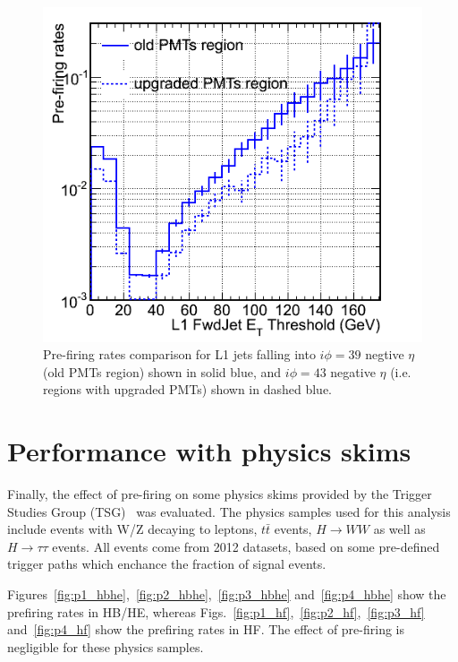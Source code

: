 \documentclass[11pt]{cmspaperpdf}
\begin{document}
\begin{figure}
\centering
\includegraphics[scale=0.45]{plots/rates_comparison_old-vs-new-PMTs.png}
\caption{Pre-firing rates comparison for L1 jets falling into $i \phi=39$ negtive $\eta$ (old PMTs region) shown in solid blue, and $i \phi=43$ negative $\eta$ (i.e. regions with upgraded PMTs) shown in dashed blue. }
\label{fig:imp} 
\end{figure}

\section{Performance with physics skims}

Finally, the effect of pre-firing on some physics skims provided by the Trigger Studies Group (TSG)~\cite{tsg} was evaluated. The physics samples used for this analysis include events with W/Z decaying to leptons, $t \bar{t}$ events, $H \rightarrow WW$ as well as $H \rightarrow \tau\tau$ events. All events come from 2012 datasets, based on some pre-defined trigger paths which enchance the fraction of signal events.

Figures~\ref{fig:p1_hbhe},~\ref{fig:p2_hbhe},~\ref{fig:p3_hbhe} and~\ref{fig:p4_hbhe} show the prefiring rates in HB/HE, whereas Figs.~\ref{fig:p1_hf},~\ref{fig:p2_hf},~\ref{fig:p3_hf} and~\ref{fig:p4_hf} show the prefiring rates in HF. The effect of pre-firing is negligible for these physics samples.
\end{document}

